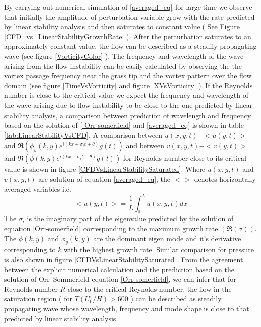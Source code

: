 \documentclass[12pt]{report}   %
\begin{document}
By carrying out numerical simulation of \eqref{averaged_eq} for large time we observe that initially the amplitude of perturbation variable grow with the rate predicted by linear stability analysis and then saturates to constant value (  See Figure \ref{CFD_vs_LinearStabilityGrowthRate} ). After the perturbation saturates to an approximately constant value, the flow can be described as a steadily propagating wave (see figure \ref{VorticityColor} ). The frequency and wavelength of the wave arising from the flow instability can be easily calculated by observing the the vortex passage frequency near the grass tip and the vortex pattern over the flow domain (see figure \ref{TimeVsVorticity} and figure \ref{XVsVorticity} ). If the Reynolds number is close to the critical value we expect the frequency and wavelength of the wave arising due to flow instability to be close to the one predicted by linear stability analysis, a comparison between prediction of wavelength and frequency based on the solution of \eqref{
Orr-somerfield} and \eqref{averaged_eq} is shown in table \ref{tab:LinearStabilityVsCFD}. A comparison between $u(x,y,t)-<u(y,t)>$ and 
 $\Re\left(\phi_y(k,y) e^{i\left(kx+\sigma_i t+ \theta\right)} g(t) \right)$  and between $v(x,y,t)-<v(y,t)>$ and $\Re\left(\phi(k,y) e^{i\left(kx+\sigma_i t+ \theta\right)} g(t) \right)$ for Reynolds number close to its critical value is shown in figure \ref{CFDVsLinearStabilitySaturated}. Where $u(x,y,t)$ and $v(x,y,t)$ are solution of equation \eqref{averaged_eq}, the $< >$ denotes horizontally averaged variables i.e.
 \[<u(y,t)> = \frac{1}{L}\int_{0}^{L} u(x,y,t) dx\]
 The $\sigma_i$ is the imaginary part of the eigenvalue predicted by the solution of equation \ref{Orr-somerfield} corresponding to the maximum growth rate $(\Re(\sigma))$. The $\phi(k,y)$ and $\phi_y(k,y)$ are the dominant eigen mode and it's derivative corresponding to $k$ with the highest growth rate. Similar comparison for pressure is also shown in figure \ref{CFDVsLinearStabilitySaturated}. From the agreement between the explicit numerical calculation and the prediction based on the solution of Orr–Sommerfeld equation \ref{Orr-somerfield}, we can infer that for Reynolds number $R$ close to the critical Reynolds number, the flow in the saturation region ( for $T(U_0/H)>600$ ) can be described as steadily propagating wave whose wavelength, frequency and mode shape is close to that predicted by linear stability analysis.  
\end{document}
